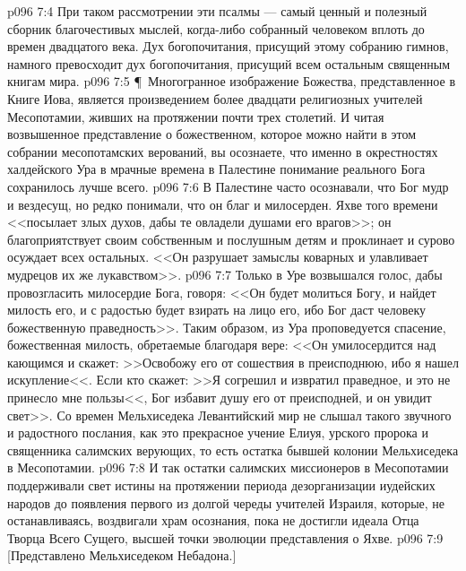 \vs p096 7:4 При таком рассмотрении эти псалмы --- самый ценный и полезный сборник благочестивых мыслей, когда\hyp{}либо собранный человеком вплоть до времен двадцатого века. Дух богопочитания, присущий этому собранию гимнов, намного превосходит дух богопочитания, присущий всем остальным священным книгам мира.
\vs p096 7:5 \P\ Многогранное изображение Божества, представленное в Книге Иова, является произведением более двадцати религиозных учителей Месопотамии, живших на протяжении почти трех столетий. И читая возвышенное представление о божественном, которое можно найти в этом собрании месопотамских верований, вы осознаете, что именно в окрестностях халдейского Ура в мрачные времена в Палестине понимание реального Бога сохранилось лучше всего.
\vs p096 7:6 В Палестине часто осознавали, что Бог мудр и вездесущ, но редко понимали, что он благ и милосерден. Яхве того времени <<посылает злых духов, дабы те овладели душами его врагов>>; он благоприятствует своим собственным и послушным детям и проклинает и сурово осуждает всех остальных. <<Он разрушает замыслы коварных и улавливает мудрецов их же лукавством>>.
\vs p096 7:7 Только в Уре возвышался голос, дабы провозгласить милосердие Бога, говоря: <<Он будет молиться Богу, и найдет милость его, и с радостью будет взирать на лицо его, ибо Бог даст человеку божественную праведность>>. Таким образом, из Ура проповедуется спасение, божественная милость, обретаемые благодаря вере: <<Он умилосердится над кающимся и скажет: >>Освобожу его от сошествия в преисподнюю, ибо я нашел искупление<<. Если кто скажет: >>Я согрешил и извратил праведное, и это не принесло мне пользы<<, Бог избавит душу его от преисподней, и он увидит свет>>. Со времен Мельхиседека Левантийский мир не слышал такого звучного и радостного послания, как это прекрасное учение Елиуя, урского пророка и священника салимских верующих, то есть остатка бывшей колонии Мельхиседека в Месопотамии.
\vs p096 7:8 И так остатки салимских миссионеров в Месопотамии поддерживали свет истины на протяжении периода дезорганизации иудейских народов до появления первого из долгой череды учителей Израиля, которые, не останавливаясь, воздвигали храм осознания, пока не достигли идеала Отца Творца Всего Сущего, высшей точки эволюции представления о Яхве.
\vs p096 7:9 [Представлено Мельхиседеком Небадона.]
